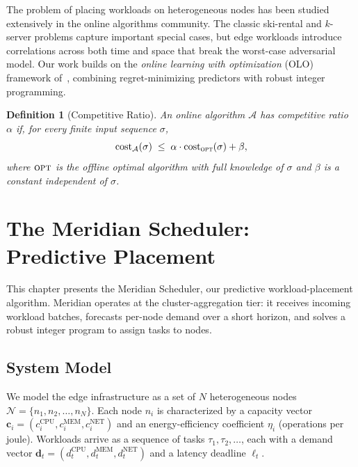 \documentclass[12pt,oneside]{book}
\newtheorem{definition}[theorem]{Definition}
\begin{document}
The problem of placing workloads on heterogeneous nodes has been studied
extensively in the online algorithms community. The classic ski-rental and
\(k\)-server problems capture important special cases, but edge workloads
introduce correlations across both time and space that break the worst-case
adversarial model. Our work builds on the \emph{online learning with
optimization} (OLO) framework of~\citet{hazan2016introduction}, combining
regret-minimizing predictors with robust integer programming.

\begin{definition}[Competitive Ratio]
\label{def:cr}
An online algorithm \(\mathcal{A}\) has competitive ratio \(\alpha\) if, for
every finite input sequence \(\sigma\),
\[
\operatorname{cost}_{\mathcal{A}}(\sigma)
\;\leq\;
\alpha \cdot \operatorname{cost}_{\textsc{opt}}(\sigma) + \beta,
\]
where \(\textsc{opt}\) is the offline optimal algorithm with full knowledge of
\(\sigma\) and \(\beta\) is a constant independent of \(\sigma\).
\end{definition}

\chapter{The Meridian Scheduler: Predictive Placement}
\label{ch:placement}

This chapter presents the Meridian Scheduler, our predictive workload-placement
algorithm. Meridian operates at the cluster-aggregation tier: it receives
incoming workload batches, forecasts per-node demand over a short horizon, and
solves a robust integer program to assign tasks to nodes.

\section{System Model}

We model the edge infrastructure as a set of \(N\) heterogeneous nodes
\(\mathcal{N} = \{n_1, n_2, \dots, n_N\}\). Each node \(n_i\) is characterized
by a capacity vector \(\mathbf{c}_i = (c_i^{\text{CPU}}, c_i^{\text{MEM}},
c_i^{\text{NET}})\) and an energy-efficiency coefficient \(\eta_i\) (operations
per joule). Workloads arrive as a sequence of tasks \(\tau_1, \tau_2, \dots\),
each with a demand vector \(\mathbf{d}_t = (d_t^{\text{CPU}}, d_t^{\text{MEM}},
d_t^{\text{NET}})\) and a latency deadline \(\ell_t\).
\end{document}
